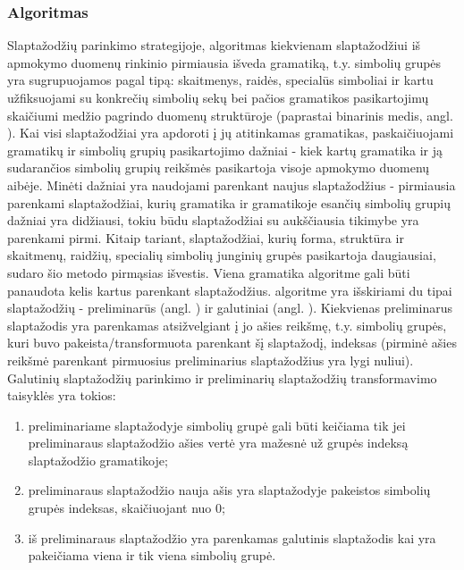 \documentclass{VUMIFInfBakalaurinis}
\begin{document}
\subsubsection{Algoritmas}
Slaptažodžių parinkimo strategijoje,  algoritmas kiekvienam 
slaptažodžiui iš apmokymo duomenų rinkinio pirmiausia išveda gramatiką, t.y. 
simbolių grupės yra sugrupuojamos pagal tipą: skaitmenys, raidės, specialūs 
simboliai ir kartu užfiksuojami su konkrečių simbolių sekų bei pačios gramatikos 
pasikartojimų skaičiumi medžio pagrindo duomenų struktūroje (paprastai binarinis 
medis, angl. ). Kai visi slaptažodžiai yra apdoroti į jų 
atitinkamas gramatikas, paskaičiuojami gramatikų ir simbolių grupių 
pasikartojimo dažniai - kiek kartų gramatika ir ją sudarančios simbolių grupių 
reikšmės pasikartoja visoje apmokymo duomenų aibėje. Minėti dažniai yra 
naudojami parenkant naujus slaptažodžius - pirmiausia parenkami slaptažodžiai, 
kurių gramatika ir gramatikoje esančių simbolių grupių dažniai yra didžiausi, 
tokiu būdu slaptažodžiai su aukščiausia tikimybe yra parenkami pirmi. Kitaip 
tariant, slaptažodžiai, kurių forma, struktūra ir skaitmenų, raidžių, specialių 
simbolių junginių grupės pasikartoja daugiausiai, sudaro šio metodo pirmąsias 
išvestis.
Viena gramatika  algoritme gali būti panaudota kelis kartus 
parenkant slaptažodžius.  algoritme yra išskiriami du tipai 
slaptažodžių - preliminarūs (angl. ) ir galutiniai 
(angl. ). Kiekvienas preliminarus slaptažodis yra parenkamas 
atsižvelgiant į jo ašies reikšmę, t.y. simbolių grupės, kuri buvo 
pakeista/transformuota parenkant šį slaptažodį, indeksas (pirminė ašies reikšmė 
parenkant pirmuosius preliminarius slaptažodžius yra lygi nuliui). Galutinių 
slaptažodžių parinkimo ir preliminarių slaptažodžių transformavimo taisyklės yra 
tokios:
\begin{enumerate}
  \item preliminariame slaptažodyje simbolių grupė gali būti keičiama tik jei 
    preliminaraus slaptažodžio ašies vertė yra mažesnė už grupės indeksą 
    slaptažodžio gramatikoje;
  \item preliminaraus slaptažodžio nauja ašis yra slaptažodyje pakeistos 
    simbolių grupės indeksas, skaičiuojant nuo 0;
  \item iš preliminaraus slaptažodžio yra parenkamas galutinis slaptažodis kai 
    yra pakeičiama viena ir tik viena simbolių grupė.
\end{enumerate}
\end{document}
